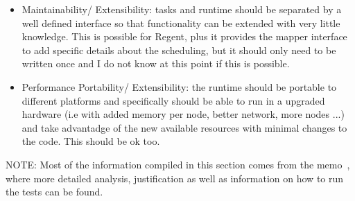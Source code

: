 \begin{itemize}
\item Maintainability/ Extensibility: tasks and runtime should be separated by a well defined interface so that functionality can be extended with very little knowledge. This is possible for Regent, plus it provides the mapper interface to add specific details about the scheduling, but it should only need to be written once and I do not know at this point if this is possible.
\item Performance Portability/ Extensibility: the runtime should be portable to different platforms and specifically should be able to run in a upgraded hardware (i.e with added memory per node, better network, more nodes ...) and take advantadge of the new available resources with minimal changes to the code. This should be ok too.
\end{itemize}

NOTE: Most of the information compiled in this section comes from the memo~\cite{RegentEval}, where more detailed analysis, justification as well as information on how to run the tests can be found.
